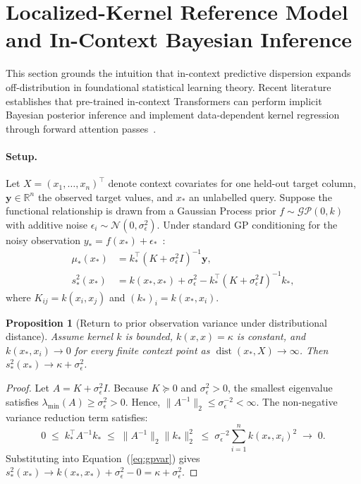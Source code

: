\documentclass{article}
\newtheorem{proposition}{Proposition}
\begin{document}
\section{Localized-Kernel Reference Model and In-Context Bayesian Inference}
\label{app:gp}

This section grounds the intuition that in-context predictive dispersion expands off-distribution in foundational statistical learning theory. Recent literature establishes that pre-trained in-context Transformers can perform implicit Bayesian posterior inference and implement data-dependent kernel regression through forward attention passes~\citep{muller2022transformers,vonoswald2023transformers,qu2026tabiclv2}.

\paragraph{Setup.}
Let $X = (x_1, \ldots, x_n)^\top$ denote context covariates for one held-out target column, $\mathbf{y} \in \mathbb{R}^n$ the observed target values, and $x_*$ an unlabelled query. Suppose the functional relationship is drawn from a Gaussian Process prior $f \sim \mathcal{GP}(0, k)$ with additive noise $\epsilon_i \sim \mathcal{N}(0, \sigma_\epsilon^2)$. Under standard GP conditioning for the noisy observation $y_* = f(x_*) + \epsilon_*$~\citep{rasmussen2006gaussian}:
\begin{align}
  \mu_*(x_*) &= k_*^\top (K + \sigma_\epsilon^2 I)^{-1} \mathbf{y}, \label{eq:gpmean}\\
  s_*^2(x_*) &= k(x_*, x_*) + \sigma_\epsilon^2 - k_*^\top (K + \sigma_\epsilon^2 I)^{-1} k_*, \label{eq:gpvar}
\end{align}
where $K_{ij} = k(x_i, x_j)$ and $(k_*)_i = k(x_*, x_i)$.

\begin{proposition}[Return to prior observation variance under distributional distance]
\label{prop:prior-var}
Assume kernel $k$ is bounded, $k(x,x)=\kappa$ is constant, and $k(x_*, x_i) \to 0$ for every finite context point as $\operatorname{dist}(x_*, X) \to \infty$. Then $s_*^2(x_*) \to \kappa + \sigma_\epsilon^2$.
\end{proposition}

\begin{proof}
Let $A = K + \sigma_\epsilon^2 I$. Because $K \succeq 0$ and $\sigma_\epsilon^2 > 0$, the smallest eigenvalue satisfies $\lambda_{\min}(A) \geq \sigma_\epsilon^2 > 0$. Hence, $\|A^{-1}\|_2 \leq \sigma_\epsilon^{-2} < \infty$. The non-negative variance reduction term satisfies:
\[
  0 \;\leq\; k_*^\top A^{-1} k_* \;\leq\; \|A^{-1}\|_2 \|k_*\|_2^2 \;\leq\; \sigma_\epsilon^{-2} \sum_{i=1}^n k(x_*, x_i)^2 \;\to\; 0.
\]
Substituting into Equation~(\ref{eq:gpvar}) gives $s_*^2(x_*) \to k(x_*, x_*) + \sigma_\epsilon^2 - 0 = \kappa + \sigma_\epsilon^2$.
\end{proof}
\end{document}
